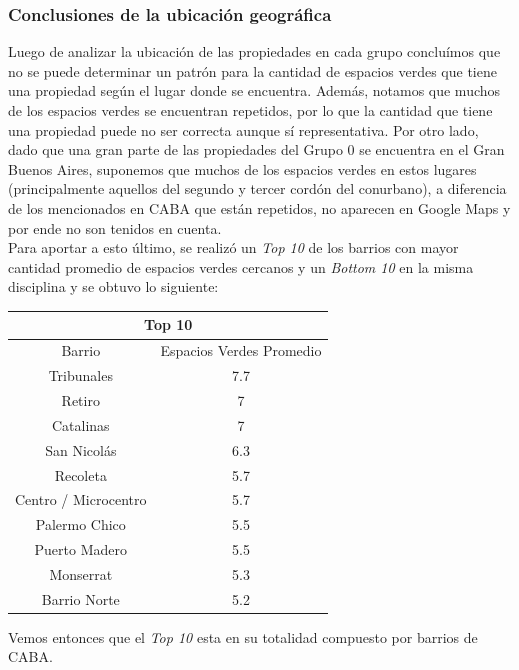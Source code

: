 \documentclass[a4paper, 10pt]{article}
\newcommand\tab[1][0.5cm]{\hspace*{#1}}
\begin{document}
			\subsubsection{Conclusiones de la ubicación geográfica}
				Luego de analizar la ubicación de las propiedades en cada grupo concluímos que no se puede determinar un patrón
				para la cantidad de espacios verdes que tiene una propiedad según el lugar donde se encuentra. Además, notamos que
				muchos de los espacios verdes se encuentran repetidos, por lo que la cantidad que tiene una propiedad puede no ser
				correcta aunque sí representativa. Por otro lado, dado que una gran parte de las propiedades del Grupo 0 se 
				encuentra en el Gran Buenos Aires, suponemos que muchos de los espacios verdes en estos lugares (principalmente
				aquellos del segundo y tercer cordón del conurbano), a diferencia de los mencionados en CABA que están repetidos,
				no aparecen en Google Maps y por ende no son tenidos en cuenta. \\
				\tab Para aportar a esto último, se realizó un \emph{Top 10} de los barrios con mayor cantidad promedio de
				espacios verdes cercanos y un \emph{Bottom 10} en la misma disciplina y se obtuvo lo siguiente:
				\begin{center}
					\begin{tabular}{ |c|c| }
						\hline
						\multicolumn{2}{|c|}{Top 10}\\
						\hline
						\hline
						Barrio & Espacios Verdes Promedio\\
						\hline
						Tribunales & 7.7 \\
						Retiro & 7 \\
						Catalinas & 7 \\
						San Nicolás & 6.3 \\
						Recoleta & 5.7 \\
						Centro / Microcentro & 5.7 \\
						Palermo Chico & 5.5 \\
						Puerto Madero & 5.5 \\
						Monserrat & 5.3 \\
						Barrio Norte & 5.2 \\
						\hline
					\end{tabular}
				\end{center}
				\tab Vemos entonces que el \emph{Top 10} esta en su totalidad compuesto por barrios de CABA.
\end{document}
